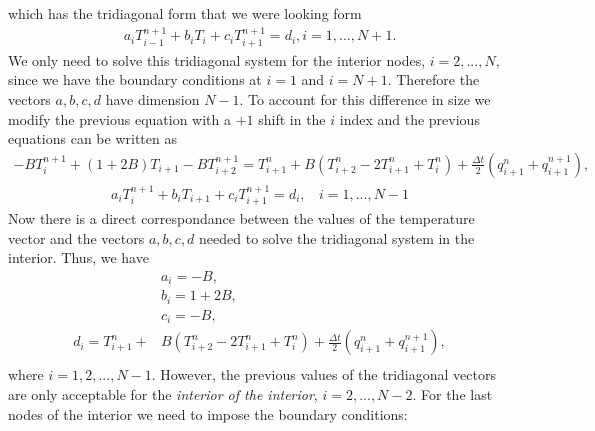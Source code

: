 which has the tridiagonal form that we were looking form
\begin{align*}
a_iT_{i-1}^{n+1}+b_iT_i+c_iT_{i+1}^{n+1}=d_i, i=1,...,N+1.
\end{align*}
We only need to solve this tridiagonal system for the interior nodes, $i=2,...,N$, since we have the boundary conditions at $i=1$ and $i=N+1$. Therefore the vectors $a,b,c,d$ have dimension $N-1$. To account for this difference in size we modify the previous equation with a $+1$ shift in the $i$ index and the previous equations can be written as
\begin{align*}
-BT_{i}^{n+1}+(1+2B)T_{i+1}-BT_{i+2}^{n+1}=T_{i+1}^n+B\left(T_{i+2}^n-2T_{i+1}^n+T_{i}^n\right)+\frac{\Delta t}{2}\left(q_{i+1}^n+q_{i+1}^{n+1}\right),
\end{align*}
\begin{align*}
a_{i}T_{i}^{n+1}+b_{i}T_{i+1}+c_{i}T_{i+1}^{n+1}=d_{i},~~~~ i=1,...,N-1
\end{align*} 
Now there is a direct correspondance between the values of the temperature vector and the vectors $a,b,c,d$ needed to solve the tridiagonal system in the interior. Thus, we have
\begin{align*}
&a_i=-B,\\
&b_i=1+2B,\\
&c_i=-B,\\
d_i=T_{i+1}^n+&B\left(T_{i+2}^n-2T_{i+1}^n+T_{i}^n\right)+\frac{\Delta t}{2}\left(q_{i+1}^{n}+q_{i+1}^{n+1}\right),\\
\end{align*}
where $i=1,2,...,N-1$. However, the previous values of the tridiagonal vectors are only acceptable for the \textit{interior of the interior}, $i=2,...,N-2$. For the last nodes of the interior we need to impose the boundary conditions:
